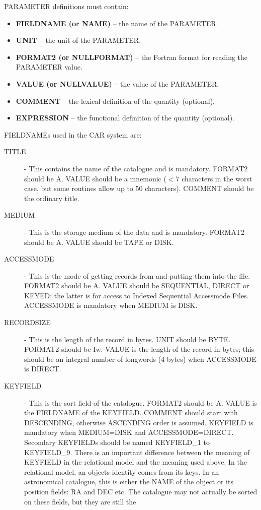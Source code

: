 PARAMETER definitions must contain:
\begin{itemize}
\item {\bf FIELDNAME (or NAME)} -- the name of the PARAMETER.
\item {\bf UNIT} -- the unit of the PARAMETER.
\item {\bf FORMAT2 (or NULLFORMAT)} -- the Fortran format for reading the
PARAMETER value.
\item {\bf VALUE (or NULLVALUE)} -- the value of the PARAMETER.
\item {\bf COMMENT} -- the lexical definition of the quantity (optional).
\item {\bf EXPRESSION} -- the functional definition of the quantity (optional).
\end{itemize}
FIELDNAMEs used in the CAR system are:
\begin{description}
\item [TITLE] -
This contains the name of the catalogue and is mandatory.
FORMAT2 should be A.
VALUE should be a mnemonic ($<$7 characters in the worst case, but some
routines allow up to 50 characters).
COMMENT should be the ordinary title.
\item [MEDIUM] -
This is the storage medium of the data and is mandatory.
FORMAT2 should be A.
VALUE should be TAPE or DISK.
\item [ACCESSMODE] -
This is the mode of getting records from and putting them into the file.
FORMAT2 should be A.
VALUE should be SEQUENTIAL, DIRECT or KEYED; the latter is for access to
Indexed Sequential Accessmode Files.
ACCESSMODE is mandatory when MEDIUM is DISK.
\item [RECORDSIZE] -
This is the length of the record in bytes.
UNIT should be BYTE.
FORMAT2 should be Iw.
VALUE is the length of the record in bytes; this should be an integral
number of longwords (4 bytes) when ACCESSMODE is DIRECT.
\item [KEYFIELD] -
This is the sort field of the catalogue.
FORMAT2 should be A.
VALUE is the FIELDNAME of the KEYFIELD.
COMMENT should start with DESCENDING, otherwise ASCENDING order is assumed.
KEYFIELD is mandatory when MEDIUM=DISK and ACCESSMODE=DIRECT.
Secondary KEYFIELDs should be named KEYFIELD\_1 to KEYFIELD\_9.
There is an important difference between the meaning of KEYFIELD in the
relational model and the meaning used above.
In the relational model, an objects identity comes from its keys.
In an astronomical catalogue, this is either the NAME of the object or its
position fields: RA and DEC etc.
The catalogue may not actually be sorted on these fields, but they are still the

\end{description}
